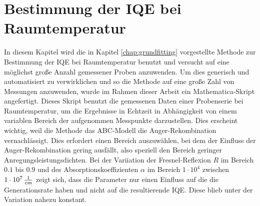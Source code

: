 \chapter{Bestimmung der IQE bei Raumtemperatur}

\label{chap:raum}
\thispagestyle{fancy}

In diesem Kapitel wird die in Kapitel \ref{chap:grundfitting} vorgestellte Methode zur Bestimmung der IQE bei Raumtemperatur benutzt und versucht auf eine möglichst große Anzahl gemessener Proben anzuwenden. 
\newline
Um dies generisch und automatisiert zu verwirklichen und so die Methode auf eine große Zahl von Messungen anzuwenden, wurde im Rahmen dieser Arbeit ein Mathematica-Skript angefertigt. Dieses Skript benutzt die gemessenen Daten einer Probenserie bei Raumtemperatur, um die Ergebnisse in Echtzeit in Abhängigkeit von einem variablen Bereich der aufgenommen Messpunkte darzustellen. Dies erscheint wichtig, weil die Methode das ABC-Modell die Auger-Rekombination vernachlässigt. Dies erfordert einen Bereich auszuwählen, bei dem der Einfluss der Auger-Rekombination gering ausfällt, also speziell den Bereich geringer Anregungsleistungsdichten.
\newline
Bei der Variiation der Fresnel-Reflexion $R$ im Bereich  
$0.1$ bis $0.9$ und des Absorptionskoeffizienten $\alpha$ im Bereich $1\cdot 10^4$ zwischen $1\cdot 10^7 \thinspace \frac{1}{cm}$ zeigt sich, dass die Parameter nur einen Einfluss auf die die Generationsrate haben und nicht auf die resultierende IQE. Diese blieb unter der Variation nahezu konstant. 
